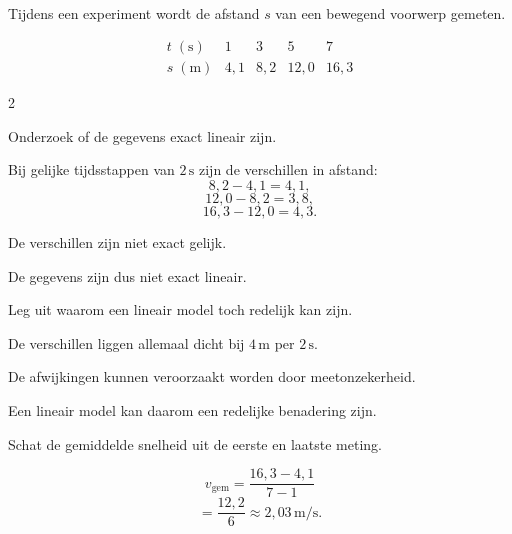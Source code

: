 \documentclass{ximera}
\begin{document}
    \begin{oefening}{\oefG}
    \\
    
    Tijdens een experiment wordt de afstand $s$ van een bewegend voorwerp gemeten.
    
    \[
    \begin{array}{c|cccc}
    t\;(\mathrm s) & 1 & 3 & 5 & 7\\
    \hline
    s\;(\mathrm m) & 4{,}1 & 8{,}2 & 12{,}0 & 16{,}3
    \end{array}
    \]
    
    \begin{multicols}{2}
    
    \begin{question}
    Onderzoek of de gegevens exact lineair zijn.
    
    \begin{oplossing}
    Bij gelijke tijdsstappen van $2\,\mathrm s$ zijn de verschillen in afstand:
    \[
    8{,}2-4{,}1=4{,}1,
    \]
    \[
    12{,}0-8{,}2=3{,}8,
    \]
    \[
    16{,}3-12{,}0=4{,}3.
    \]
    
    De verschillen zijn niet exact gelijk.
    
    De gegevens zijn dus niet exact lineair.
    \end{oplossing}
    \end{question}
    
    
    \begin{question}
    Leg uit waarom een lineair model toch redelijk kan zijn.
    
    \begin{oplossing}
    De verschillen liggen allemaal dicht bij $4\,\mathrm m$ per $2\,\mathrm s$.
    
    De afwijkingen kunnen veroorzaakt worden door meetonzekerheid.
    
    Een lineair model kan daarom een redelijke benadering zijn.
    \end{oplossing}
    \end{question}
    
    
    \begin{question}
    Schat de gemiddelde snelheid uit de eerste en laatste meting.
    
    \begin{oplossing}
    \[
    v_{\mathrm{gem}}
    =
    \frac{16{,}3-4{,}1}{7-1}
    \]
    \[
    =
    \frac{12{,}2}{6}
    \approx2{,}03\,\mathrm{m/s}.
    \]
    \end{oplossing}
    \end{question}
    

\end{multicols}
\end{oefening}
\end{document}
